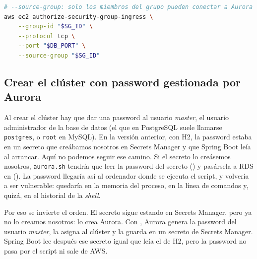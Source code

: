 \documentclass[12pt,a4paper]{article}
\begin{document}
\begin{lstlisting}[language=bash,basicstyle=\ttfamily\footnotesize]
# --source-group: solo los miembros del grupo pueden conectar a Aurora
aws ec2 authorize-security-group-ingress \
    --group-id "$SG_ID" \
    --protocol tcp \
    --port "$DB_PORT" \
    --source-group "$SG_ID"
\end{lstlisting}

\vspace{1em}

\subsection{Crear el clúster con password gestionada por Aurora}\label{sec:crear-cluster}

Al crear el clúster hay que dar una password al usuario \textit{master}, el usuario administrador de la base de datos (el que en PostgreSQL suele llamarse \texttt{postgres}, o \texttt{root} en MySQL). En la versión anterior, con H2, la password estaba en un secreto que creábamos nosotros en Secrets Manager y que Spring Boot leía al arrancar. Aquí no podemos seguir ese camino. Si el secreto lo creásemos nosotros, \texttt{aurora.sh} tendría que leer la password del secreto (\texttt{}) y pasársela a RDS en \texttt{} (\texttt{}). La password llegaría así al ordenador donde se ejecuta el script, y volvería a ser vulnerable: quedaría en la memoria del proceso, en la línea de comandos y, quizá, en el historial de la \textit{shell}.

Por eso se invierte el orden. El secreto sigue estando en Secrets Manager, pero ya no lo creamos nosotros: lo crea Aurora. Con \texttt{}, Aurora genera la password del usuario \textit{master}, la asigna al clúster y la guarda en un secreto de Secrets Manager. Spring Boot lee después ese secreto igual que leía el de H2, pero la password no pasa por el script ni sale de AWS.
\end{document}

